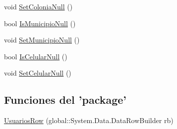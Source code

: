 \begin{DoxyCompactItemize}
\item 
void \hyperlink{class_proyecto___integrador__3_1_1ds_usuarios_1_1_usuarios_row_ac466ee8841f0797f997cd4f058439fbf}{Set\-Colonia\-Null} ()
\item 
bool \hyperlink{class_proyecto___integrador__3_1_1ds_usuarios_1_1_usuarios_row_a16f077a1f2458872bb676a01c791e680}{Is\-Municipio\-Null} ()
\item 
void \hyperlink{class_proyecto___integrador__3_1_1ds_usuarios_1_1_usuarios_row_acd888a79fcad0d01ecbb9ed5bf545fa5}{Set\-Municipio\-Null} ()
\item 
bool \hyperlink{class_proyecto___integrador__3_1_1ds_usuarios_1_1_usuarios_row_a91df593253badb10ea5a851145664375}{Is\-Celular\-Null} ()
\item 
void \hyperlink{class_proyecto___integrador__3_1_1ds_usuarios_1_1_usuarios_row_a41d4aabf17b3c2d96a6fff800b2c5bb9}{Set\-Celular\-Null} ()
\end{DoxyCompactItemize}
\subsection*{Funciones del 'package'}
\begin{DoxyCompactItemize}
\item 
\hyperlink{class_proyecto___integrador__3_1_1ds_usuarios_1_1_usuarios_row_a6bff372090116bad1cbc7689a4309716}{Usuarios\-Row} (global\-::\-System.\-Data.\-Data\-Row\-Builder rb)
\end{DoxyCompactItemize}
